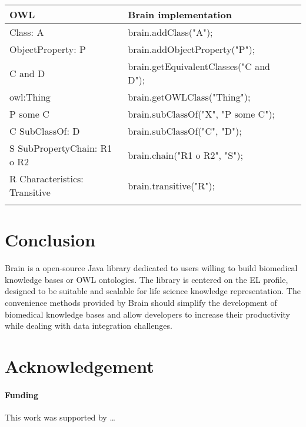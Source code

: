 \documentclass{bioinfo}
\begin{document}
\begin{table}[!h]
{\begin{tabular}{llll}\toprule
OWL & Brain implementation\\\midrule
Class: A & brain.addClass("A");\\
ObjectProperty: P & brain.addObjectProperty("P");\\
C and D & brain.getEquivalentClasses("C and D");\\
owl:Thing & brain.getOWLClass("Thing");\\
P some C & brain.subClassOf("X", "P some C");\\
C SubClassOf: D & brain.subClassOf("C", "D");\\
S SubPropertyChain: R1 o R2 & brain.chain("R1 o R2", "S");\\
R Characteristics: Transitive & brain.transitive("R");\\\botrule
\end{tabular}}{}
\end{table}

\section{Conclusion}
Brain is a open-source Java library dedicated to users willing to build biomedical knowledge bases or OWL ontologies. 
The library is centered on the EL profile, designed to be suitable and scalable for life science knowledge representation. 
The convenience methods provided by Brain should simplify the development of biomedical knowledge bases and allow developers
to increase their productivity while dealing with data integration challenges.

\section*{Acknowledgement}
\paragraph{Funding\textcolon}
This work was supported by …
 
%  
%  
%  
%  
%  
%  
%  
%  
%  
\end{document}
